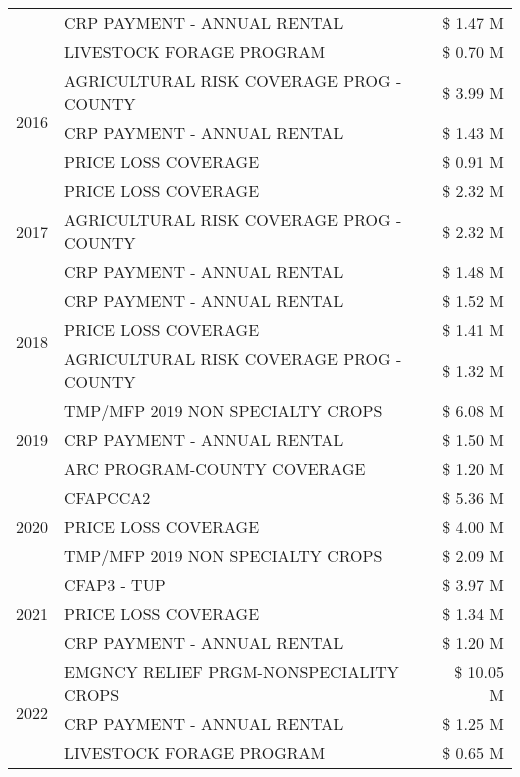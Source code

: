 \begin{tabular}{llr}
 & CRP PAYMENT - ANNUAL RENTAL & \$ 1.47 M \\
 & LIVESTOCK FORAGE PROGRAM & \$ 0.70 M \\
\cline{1-3}
\multirow[t]{3}{*}{2016} & AGRICULTURAL RISK COVERAGE PROG - COUNTY & \$ 3.99 M \\
 & CRP PAYMENT - ANNUAL RENTAL & \$ 1.43 M \\
 & PRICE LOSS COVERAGE & \$ 0.91 M \\
\cline{1-3}
\multirow[t]{3}{*}{2017} & PRICE LOSS COVERAGE & \$ 2.32 M \\
 & AGRICULTURAL RISK COVERAGE PROG - COUNTY & \$ 2.32 M \\
 & CRP PAYMENT - ANNUAL RENTAL & \$ 1.48 M \\
\cline{1-3}
\multirow[t]{3}{*}{2018} & CRP PAYMENT - ANNUAL RENTAL & \$ 1.52 M \\
 & PRICE LOSS COVERAGE & \$ 1.41 M \\
 & AGRICULTURAL RISK COVERAGE PROG - COUNTY & \$ 1.32 M \\
\cline{1-3}
\multirow[t]{3}{*}{2019} & TMP/MFP 2019 NON SPECIALTY CROPS & \$ 6.08 M \\
 & CRP PAYMENT - ANNUAL RENTAL & \$ 1.50 M \\
 & ARC PROGRAM-COUNTY COVERAGE & \$ 1.20 M \\
\cline{1-3}
\multirow[t]{3}{*}{2020} & CFAPCCA2 & \$ 5.36 M \\
 & PRICE LOSS COVERAGE & \$ 4.00 M \\
 & TMP/MFP 2019 NON SPECIALTY CROPS & \$ 2.09 M \\
\cline{1-3}
\multirow[t]{3}{*}{2021} & CFAP3 - TUP & \$ 3.97 M \\
 & PRICE LOSS COVERAGE & \$ 1.34 M \\
 & CRP PAYMENT - ANNUAL RENTAL & \$ 1.20 M \\
\cline{1-3}
\multirow[t]{3}{*}{2022} & EMGNCY RELIEF PRGM-NONSPECIALITY CROPS & \$ 10.05 M \\
 & CRP PAYMENT - ANNUAL RENTAL & \$ 1.25 M \\
 & LIVESTOCK FORAGE PROGRAM & \$ 0.65 M \\
\cline{1-3}
\bottomrule
\end{tabular}
